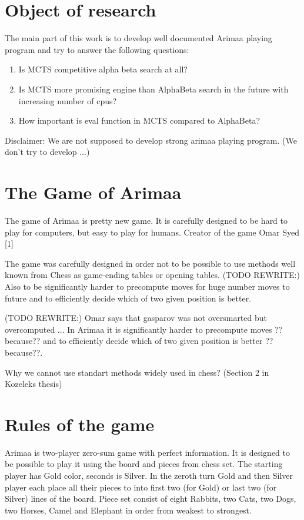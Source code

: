 \section{Object of research}
The main part of this work is to develop well documented Arimaa playing program
and try to answer the following questions:

\begin{enumerate}
\item Is MCTS competitive alpha beta search at all?
\item Is MCTS more promising engine than AlphaBeta search in the future with
      increasing number of cpus?
\item How important is eval function in MCTS compared to AlphaBeta?
\end{enumerate}

Disclaimer: We are not supposed to develop strong arimaa playing program. (We don't try to develop ...)

\section{The Game of Arimaa}
The game of Arimaa is pretty new game. It is carefully designed to be hard to
play for computers, but easy to play for humans. Creator of the game Omar
Syed [1]

The game was carefully designed in order not to be possible to use methods
well known from Chess as game-ending tables or opening tables. (TODO
REWRITE:) Also to be significantly harder to precompute moves for huge
number moves to future and to efficiently decide which of two given position
is better.

(TODO REWRITE:) Omar says that gasparov was not oversmarted but overcomputed ...
In Arimaa it is significantly harder to precompute moves ??because?? and to
efficiently decide which of two given position is better ??because??.

Why we cannot use standart methods widely used in chess? (Section 2 in Kozeleks thesis)

\section{Rules of the game}
Arimaa is two-player zero-sum game with perfect information. It is designed to
be possible to play it using the board and pieces from chess set. The starting
player has Gold color, seconds is Silver. In the zeroth turn Gold and then
Silver player each place all their pieces to into first two (for Gold) or last
two (for Silver) lines of the board. Piece set consist of eight Rabbits, two
Cats, two Dogs, two Horses, Camel and Elephant in order from weakest to
strongest.

